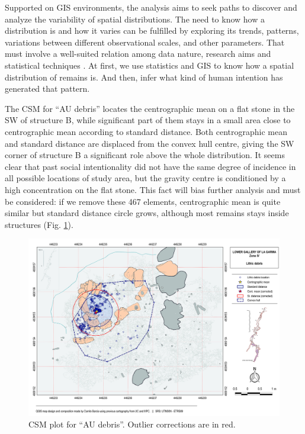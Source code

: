 Supported on GIS environments, the analysis aims to seek paths to discover and analyze the variability of spatial distributions. The need to know how a distribution is and how it varies can be fulfilled by exploring its trends, patterns, variations between different observational scales, and other parameters. That must involve a well-suited relation among data nature, research aims and statistical techniques \parencites{Anselin_1999}{Bivand_2010}. At first, we use statistics and GIS to know how a spatial distribution of remains is. And then, infer what kind of human intention has generated that pattern. 


The CSM for “AU debris” locates the centrographic mean on a flat stone in the SW of structure B, while significant part of them stays in a small area close to centrographic mean according to standard distance. Both centrographic mean and standard distance are displaced from the convex hull centre, giving the SW corner of structure B a significant role above the whole distribution. It seems clear that past social intentionality did not have the same degree of incidence in all possible locations of study area, but the gravity centre is conditioned by a high concentration on the flat stone. This fact will bias further analysis and must be considered: if we remove these 467 elements, centrographic mean is quite similar but standard distance circle grows, although most remains stays inside structures (Fig. \ref{fig:Garcia_Fig3}).

\begin{figure}
	\includegraphics[width=\linewidth]{figures/garcia_Fig3}
	\centering
	\caption{CSM plot for “AU debris”. Outlier corrections are in red.}
	\label{fig:Garcia_Fig3}
\end{figure}

